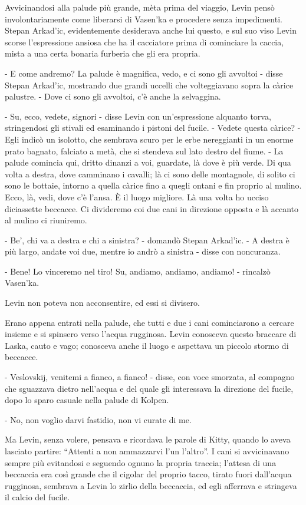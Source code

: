 Avvicinandosi alla palude più grande, mèta prima del viaggio, Levin pensò involontariamente come liberarsi di Vasen'ka e procedere senza impedimenti. Stepan Arkad'ic, evidentemente desiderava anche lui questo, e sul suo viso Levin scorse l'espressione ansiosa che ha il cacciatore prima di cominciare la caccia, mista a una certa bonaria furberia che gli era propria. 

- E come andremo? La palude è magnifica, vedo, e ci sono gli avvoltoi - disse Stepan Arkad'ic, mostrando due grandi uccelli che volteggiavano sopra la càrice palustre. - Dove ci sono gli avvoltoi, c'è anche la selvaggina. 

- Su, ecco, vedete, signori - disse Levin con un'espressione alquanto torva, stringendosi gli stivali ed esaminando i pistoni del fucile. - Vedete questa càrice? - Egli indicò un isolotto, che sembrava scuro per le erbe nereggianti in un enorme prato bagnato, falciato a metà, che si stendeva sul lato destro del fiume. - La palude comincia qui, dritto dinanzi a voi, guardate, là dove è più verde. Di qua volta a destra, dove camminano i cavalli; là ci sono delle montagnole, di solito ci sono le bottaie, intorno a quella càrice fino a quegli ontani e fin proprio al mulino. Ecco, là, vedi, dove c'è l'ansa. È il luogo migliore. Là una volta ho ucciso diciassette beccacce. Ci divideremo coi due cani in direzione opposta e là accanto al mulino ci riuniremo. 

- Be', chi va a destra e chi a sinistra? - domandò Stepan Arkad'ic. - A destra è più largo, andate voi due, mentre io andrò a sinistra - disse con noncuranza. 

- Bene! Lo vinceremo nel tiro! Su, andiamo, andiamo, andiamo! - rincalzò Vasen'ka. 

Levin non poteva non acconsentire, ed essi si divisero. 

Erano appena entrati nella palude, che tutti e due i cani cominciarono a cercare insieme e si spinsero verso l'acqua rugginosa. Levin conosceva questo braccare di Laska, cauto e vago; conosceva anche il luogo e aspettava un piccolo stormo di beccacce. 

- Veslovskij, venitemi a fianco, a fianco! - disse, con voce smorzata, al compagno che sguazzava dietro nell'acqua e del quale gli interessava la direzione del fucile, dopo lo sparo casuale nella palude di Kolpen. 

- No, non voglio darvi fastidio, non vi curate di me. 

Ma Levin, senza volere, pensava e ricordava le parole di Kitty, quando lo aveva lasciato partire: ``Attenti a non ammazzarvi l'un l'altro''. I cani si avvicinavano sempre più evitandosi e seguendo ognuno la propria traccia; l'attesa di una beccaccia era così grande che il cigolar del proprio tacco, tirato fuori dall'acqua rugginosa, sembrava a Levin lo zirlio della beccaccia, ed egli afferrava e stringeva il calcio del fucile. 

